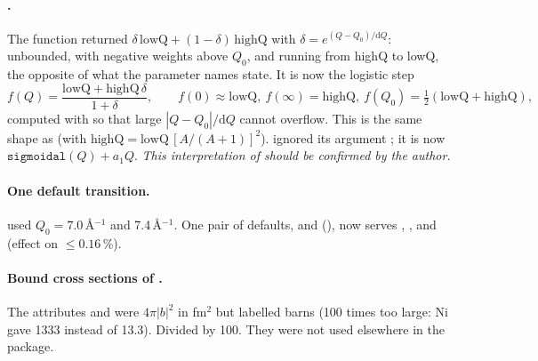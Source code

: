 \documentclass[11pt,a4paper]{article}
\begin{document}
\paragraph{ .} \newbeh{} The function returned
$\delta\,\mathrm{lowQ} + (1-\delta)\,\mathrm{highQ}$ with
$\delta = e^{(Q-Q_0)/\mathrm{d}Q}$: unbounded, with negative weights above
$Q_0$, and running from highQ to lowQ, the opposite of what the parameter
names state. It is now the logistic step
\begin{equation}
  f(Q) = \frac{\mathrm{lowQ} + \mathrm{highQ}\,\delta}{1+\delta},\qquad
  f(0)\approx\mathrm{lowQ},\ f(\infty) = \mathrm{highQ},\ f(Q_0) = \tfrac12(\mathrm{lowQ}+\mathrm{highQ}),
\end{equation}
computed with  so that large $|Q-Q_0|/\mathrm{d}Q$
cannot overflow. This is the same shape as 
(with $\mathrm{highQ} = \mathrm{lowQ}\,[A/(A+1)]^2$). 
ignored its argument ; it is now $\texttt{sigmoidal}(Q) + a_1 Q$.
\emph{This interpretation of  should be confirmed by the author.}

\paragraph{ One default transition.}  used
$Q_0=7.0$\,\AA$^{-1}$ and  7.4\,\AA$^{-1}$. One pair of
defaults,  and 
(), now serves , ,
 and  (effect on 
$\le 0.16$\,\%).

\paragraph{ Bound cross sections of .} The
attributes  and  were $4\pi|b|^2$ in fm$^2$
but labelled barns (100 times too large: Ni gave 1333 instead of 13.3).
Divided by 100. They were not used elsewhere in the package.

\label{sec:structure}
\end{document}
